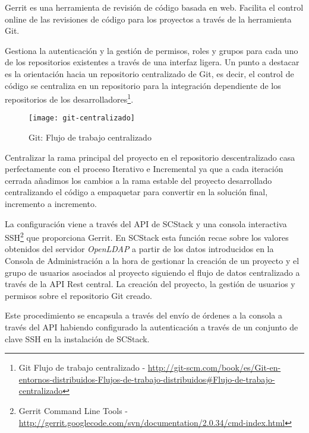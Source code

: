\par Gerrit es una herramienta de revisión de código basada en web. Facilita el control online de las revisiones de código para los proyectos a través de la herramienta Git.

\par Gestiona la autenticación y la gestión de permisos, roles y grupos para cada uno de los repositorios existentes a través de una interfaz ligera. Un punto a destacar es la orientación hacia un repositorio centralizado de Git, es decir, el control de código se centraliza en un repositorio para la integración dependiente de los repositorios de los desarrolladores\footnote{Git Flujo de trabajo centralizado - \url{http://git-scm.com/book/es/Git-en-entornos-distribuidos-Flujos-de-trabajo-distribuidos\#Flujo-de-trabajo-centralizado}}.

\begin{figure}[H]
    \centering
    \texttt{[image: git-centralizado]}
    \caption{Git: Flujo de trabajo centralizado}
    \label{fig:git-centralizado}
\end{figure}

\par Centralizar la rama principal del proyecto en el repositorio descentralizado casa perfectamente con el proceso Iterativo e Incremental ya que a cada iteración cerrada añadimos los cambios a la rama estable del proyecto desarrollado centralizando el código a empaquetar para convertir en la solución final, incremento a incremento.

\par La configuración viene a través del API de SCStack y una consola interactiva SSH\footnote{Gerrit Command Line Tools - \url{http://gerrit.googlecode.com/svn/documentation/2.0.34/cmd-index.html}} que proporciona Gerrit. En SCStack esta función recae sobre los valores obtenidos del servidor \emph{OpenLDAP} a partir de los datos introducidos en la Consola de Administración a la hora de gestionar la creación de un proyecto y el grupo de usuarios asociados al proyecto siguiendo el flujo de datos centralizado a través de la API Rest central. La creación del proyecto, la gestión de usuarios y permisos sobre el repositorio Git creado.

\par Este procedimiento se encapsula a través del envío de órdenes a la consola a través del API habiendo configurado la autenticación a través de un conjunto de clave SSH en la instalación de SCStack.

